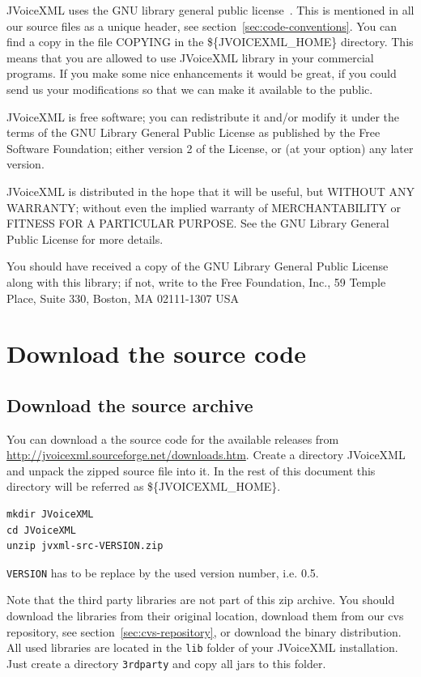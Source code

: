 \documentclass[11pt,a4paper]{article}
\begin{document}
JVoiceXML uses the GNU library general public license~\cite{gnu:lgpg}. 
This is mentioned in all our source files as a unique header, see
section~\ref{sec:code-conventions}.
You can find a copy in the file COPYING in the \$\{JVOICEXML\_HOME\}
directory. This means that you are allowed to use JVoiceXML
library in your commercial programs. If you make some nice
enhancements it would be great, if you could send us your
modifications so that we can make it available to the public.

JVoiceXML is free software; you can redistribute it and/or
modify it under the terms of the GNU Library General Public
License as published by the Free Software Foundation; either
version 2 of the License, or (at your option) any later version.

JVoiceXML is distributed in the hope that it will be useful,
but WITHOUT ANY WARRANTY; without even the implied warranty of
MERCHANTABILITY or FITNESS FOR A PARTICULAR PURPOSE. See the GNU
Library General Public License for more details.

You should have received a copy of the GNU Library General Public
License along with this library; if not, write to the Free
Foundation, Inc., 59 Temple Place, Suite 330, Boston, MA  02111-1307  USA

\section{Download the source code}

\subsection{Download the source archive}

You can download a the source code for the available releases from 
\url{http://jvoicexml.sourceforge.net/downloads.htm}.
Create a directory JVoice\-XML and unpack the zipped source file into it.
In the rest of this document this directory will be referred as
\$\{JVOICE\-XML\_HOME\}.

\begin{lstlisting}
mkdir JVoiceXML
cd JVoiceXML
unzip jvxml-src-VERSION.zip
\end{lstlisting}

\texttt{VERSION} has to be replace by the used version number, i.e. 0.5.

Note that the third party libraries are not part of this zip archive.
You should download the libraries from their original location,
download them from our cvs repository, see 
section~\ref{sec:cvs-repository}, or download the binary distribution.
All used libraries are located in the \texttt{lib} folder of
your JVoiceXML installation. Just create a directory 
\texttt{3rdparty} and copy all jars to this folder.
\end{document}
